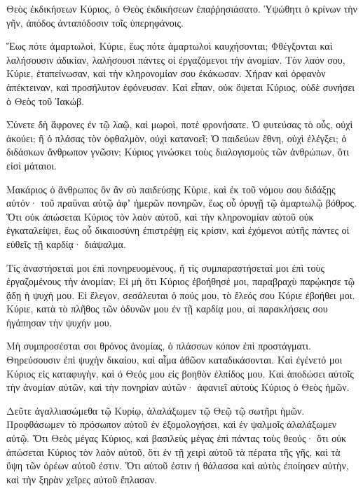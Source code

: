\begin{spacing}{1.1}
\begin{multicols}{2}
Θεὸς ἐκδικήσεων Κύριος, ὁ Θεὸς ἐκδικήσεων ἐπαῤῥησιάσατο.
Ὑψώθητι ὁ κρίνων τὴν γῆν, ἀπόδος ἀνταπόδοσιν τοῖς ὑπερηφάνοις.

Ἕως πότε ἁμαρτωλοὶ, Κύριε, ἕως πότε ἁμαρτωλοὶ καυχήσονται;
Φθέγξονται καὶ λαλήσουσιν ἀδικίαν, λαλήσουσι πάντες οἱ ἐργαζόμενοι τὴν ἀνομίαν.
Τὸν λαόν σου, Κύριε, ἐταπείνωσαν, καὶ τὴν κληρονομίαν σου ἐκάκωσαν.
Χήραν καὶ ὀρφανὸν ἀπέκτειναν, καὶ προσήλυτον ἐφόνευσαν.
Καὶ εἶπαν, οὐκ ὄψεται Κύριος, οὐδὲ συνήσει ὁ Θεὸς τοῦ Ἰακώβ.

Σύνετε δὴ ἄφρονες ἐν τῷ λαῷ, καὶ μωροὶ, ποτὲ φρονήσατε.
Ὁ φυτεύσας τὸ οὖς, οὐχὶ ἀκούει; ἢ ὁ πλάσας τὸν ὀφθαλμὸν, οὐχὶ κατανοεῖ;
Ὁ παιδεύων ἔθνη, οὐχὶ ἐλέγξει; ὁ διδάσκων ἄνθρωπον γνῶσιν;
Κύριος γινώσκει τοὺς διαλογισμοὺς τῶν ἀνθρώπων, ὅτι εἰσὶ μάταιοι.

Μακάριος ὁ ἄνθρωπος ὃν ἂν σὺ παιδεύσῃς Κύριε, καὶ ἐκ τοῦ νόμου σου διδάξῃς αὐτόν·
τοῦ πραΰναι αὐτῷ ἀφʼ ἡμερῶν πονηρῶν, ἕως οὗ ὀρυγῇ τῷ ἁμαρτωλῷ βόθρος.
Ὅτι οὐκ ἀπώσεται Κύριος τὸν λαὸν αὐτοῦ, καὶ τὴν κληρονομίαν αὐτοῦ οὐκ ἐγκαταλείψει,
ἕως οὗ δικαιοσύνη ἐπιστρέψῃ εἰς κρίσιν, καὶ ἐχόμενοι αὐτῆς πάντες οἱ εὐθεῖς τῇ καρδίᾳ· διάψαλμα.

Τίς ἀναστήσεταί μοι ἐπὶ πονηρευομένους, ἢ τίς συμπαραστήσεταί μοι ἐπὶ τοὺς ἐργαζομένους τὴν ἀνομίαν;
Εἰ μὴ ὅτι Κύριος ἐβοήθησέ μοι, παραβραχὺ παρῴκησε τῷ ᾅδῃ ἡ ψυχή μου.
Εἰ ἔλεγον, σεσάλευται ὁ πούς μου, τὸ ἔλεός σου Κύριε ἐβοήθει μοι.
Κύριε, κατὰ τὸ πλῆθος τῶν ὀδυνῶν μου ἐν τῇ καρδίᾳ μου, αἱ παρακλήσεις σου ἠγάπησαν τὴν ψυχήν μου.

Μὴ συμπροσέσται σοι θρόνος ἀνομίας, ὁ πλάσσων κόπον ἐπὶ προστάγματι.
Θηρεύσουσιν ἐπὶ ψυχὴν δικαίου, καὶ αἷμα ἀθῶον καταδικάσονται.
Καὶ ἐγένετό μοι Κύριος εἰς καταφυγὴν, καὶ ὁ Θεός μου εἰς βοηθὸν ἐλπίδος μου.
Καὶ ἀποδώσει αὐτοῖς τὴν ἀνομίαν αὐτῶν, καὶ τὴν πονηρίαν αὐτῶν· ἀφανιεῖ αὐτοὺς Κύριος ὁ Θεὸς ἡμῶν.

Δεῦτε ἀγαλλιασώμεθα τῷ Κυρίῳ, ἀλαλάξωμεν τῷ Θεῷ τῷ σωτῆρι ἡμῶν.
Προφθάσωμεν τὸ πρόσωπον αὐτοῦ ἐν ἐξομολογήσει, καὶ ἐν ψαλμοῖς ἀλαλάξωμεν αὐτῷ.
Ὅτι Θεὸς μέγας Κύριος, καὶ βασιλεὺς μέγας ἐπὶ πάντας τοὺς θεούς·
ὅτι οὐκ ἀπώσεται Κύριος τὸν λαὸν αὐτοῦ, ὅτι ἐν τῇ χειρὶ αὐτοῦ τὰ πέρατα τῆς γῆς, καὶ τὰ ὕψη τῶν ὀρέων αὐτοῦ ἐστιν.
Ὅτι αὐτοῦ ἐστιν ἡ θάλασσα καὶ αὐτὸς ἐποίησεν αὐτὴν, καὶ τὴν ξηρὰν χεῖρες αὐτοῦ ἔπλασαν.


\end{multicols}
\end{spacing}
